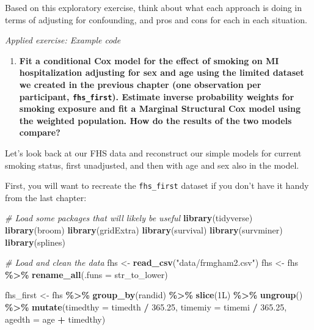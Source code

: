 \documentclass[
]{book}
\newenvironment{Shaded}{\begin{snugshade}}{\end{snugshade}}
\newcommand{\AttributeTok}[1]{\textcolor[rgb]{0.13,0.29,0.53}{#1}}
\newcommand{\CommentTok}[1]{\textcolor[rgb]{0.56,0.35,0.01}{\textit{#1}}}
\newcommand{\DataTypeTok}[1]{\textcolor[rgb]{0.13,0.29,0.53}{#1}}
\newcommand{\DecValTok}[1]{\textcolor[rgb]{0.00,0.00,0.81}{#1}}
\newcommand{\FloatTok}[1]{\textcolor[rgb]{0.00,0.00,0.81}{#1}}
\newcommand{\FunctionTok}[1]{\textcolor[rgb]{0.13,0.29,0.53}{\textbf{#1}}}
\newcommand{\NormalTok}[1]{#1}
\newcommand{\OtherTok}[1]{\textcolor[rgb]{0.56,0.35,0.01}{#1}}
\newcommand{\SpecialCharTok}[1]{\textcolor[rgb]{0.81,0.36,0.00}{\textbf{#1}}}
\newcommand{\StringTok}[1]{\textcolor[rgb]{0.31,0.60,0.02}{#1}}
\providecommand{\tightlist}{%
  \setlength{\itemsep}{0pt}\setlength{\parskip}{0pt}}
\begin{document}
Based on this exploratory exercise, think about what each approach is doing in terms of adjusting for confounding, and pros and cons for each in each situation.

\emph{Applied exercise: Example code}

\begin{enumerate}
\def\labelenumi{\arabic{enumi}.}
\tightlist
\item
  \textbf{Fit a conditional Cox model for the effect of smoking on MI hospitalization adjusting for sex and age using the limited dataset we created in the previous chapter (one observation per participant, \texttt{fhs\_first}). Estimate inverse probability weights for smoking exposure and fit a Marginal Structural Cox model using the weighted population. How do the results of the two models compare?}
\end{enumerate}

Let's look back at our FHS data and reconstruct our simple models for current smoking status, first unadjusted, and then with age and sex also in the model.

First, you will want to recreate the \texttt{fhs\_first} dataset if you don't have it handy from the last chapter:

\begin{Shaded}
\begin{Highlighting}[]
\CommentTok{\# Load some packages that will likely be useful}
\FunctionTok{library}\NormalTok{(tidyverse)}
\FunctionTok{library}\NormalTok{(broom)}
\FunctionTok{library}\NormalTok{(gridExtra)}
\FunctionTok{library}\NormalTok{(survival)}
\FunctionTok{library}\NormalTok{(survminer)}
\FunctionTok{library}\NormalTok{(splines)}

\CommentTok{\# Load and clean the data}
\NormalTok{fhs }\OtherTok{\textless{}{-}} \FunctionTok{read\_csv}\NormalTok{(}\StringTok{"data/frmgham2.csv"}\NormalTok{)}
\NormalTok{fhs }\OtherTok{\textless{}{-}}\NormalTok{ fhs }\SpecialCharTok{\%\textgreater{}\%} 
  \FunctionTok{rename\_all}\NormalTok{(}\AttributeTok{.funs =}\NormalTok{ str\_to\_lower)}

\NormalTok{fhs\_first }\OtherTok{\textless{}{-}}\NormalTok{ fhs }\SpecialCharTok{\%\textgreater{}\%} 
  \FunctionTok{group\_by}\NormalTok{(randid) }\SpecialCharTok{\%\textgreater{}\%} 
  \FunctionTok{slice}\NormalTok{(}\DecValTok{1}\DataTypeTok{L}\NormalTok{) }\SpecialCharTok{\%\textgreater{}\%} 
  \FunctionTok{ungroup}\NormalTok{() }\SpecialCharTok{\%\textgreater{}\%}
  \FunctionTok{mutate}\NormalTok{(}\AttributeTok{timedthy =}\NormalTok{ timedth }\SpecialCharTok{/} \FloatTok{365.25}\NormalTok{,}
         \AttributeTok{timemiy =}\NormalTok{ timemi }\SpecialCharTok{/} \FloatTok{365.25}\NormalTok{,}
         \AttributeTok{agedth =}\NormalTok{ age }\SpecialCharTok{+}\NormalTok{ timedthy) }
\end{Highlighting}
\end{Shaded}
\end{document}
